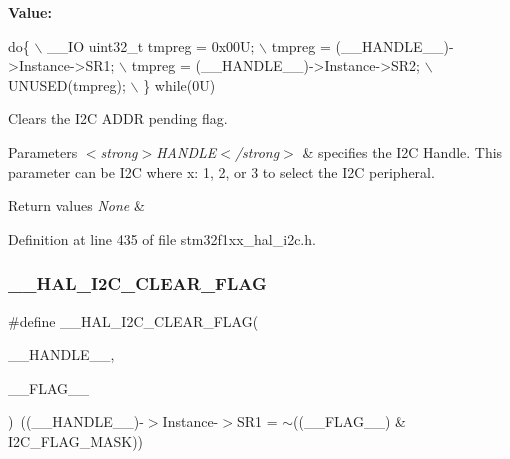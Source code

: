 {\bfseries Value\+:}
\begin{DoxyCode}
\textcolor{keywordflow}{do}\{                                           \(\backslash\)
    \_\_IO uint32\_t tmpreg = 0x00U;               \(\backslash\)
    tmpreg = (\_\_HANDLE\_\_)->Instance->SR1;       \(\backslash\)
    tmpreg = (\_\_HANDLE\_\_)->Instance->SR2;       \(\backslash\)
    UNUSED(tmpreg);                             \(\backslash\)
  \} \textcolor{keywordflow}{while}(0U)
\end{DoxyCode}


Clears the I2C A\+D\+DR pending flag. 


\begin{DoxyParams}{Parameters}
{\em $<$strong$>$\+H\+A\+N\+D\+L\+E$<$/strong$>$} & specifies the I2C Handle. This parameter can be I2C where x\+: 1, 2, or 3 to select the I2C peripheral. \\
\hline
\end{DoxyParams}

\begin{DoxyRetVals}{Return values}
{\em None} & \\
\hline
\end{DoxyRetVals}


Definition at line 435 of file stm32f1xx\+\_\+hal\+\_\+i2c.\+h.

\mbox{\label{group___i2_c___exported___macros_ga933e2ea67e86db857a06b70a93be1186}} 
\subsubsection{\texorpdfstring{\+\_\+\+\_\+\+H\+A\+L\+\_\+\+I2\+C\+\_\+\+C\+L\+E\+A\+R\+\_\+\+F\+L\+AG}{\_\_HAL\_I2C\_CLEAR\_FLAG}}
{\footnotesize\ttfamily \#define \+\_\+\+\_\+\+H\+A\+L\+\_\+\+I2\+C\+\_\+\+C\+L\+E\+A\+R\+\_\+\+F\+L\+AG(\begin{DoxyParamCaption}\item[{}]{\+\_\+\+\_\+\+H\+A\+N\+D\+L\+E\+\_\+\+\_\+,  }\item[{}]{\+\_\+\+\_\+\+F\+L\+A\+G\+\_\+\+\_\+ }\end{DoxyParamCaption})~((\+\_\+\+\_\+\+H\+A\+N\+D\+L\+E\+\_\+\+\_\+)-\/$>$Instance-\/$>$S\+R1 = $\sim$((\+\_\+\+\_\+\+F\+L\+A\+G\+\_\+\+\_\+) \& I2\+C\+\_\+\+F\+L\+A\+G\+\_\+\+M\+A\+SK))}



